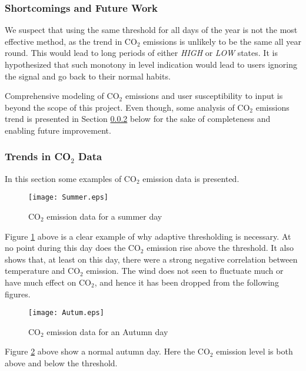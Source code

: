 \documentclass[Main]{subfiles}
\begin{document}
	\subsubsection{Shortcomings and Future Work} %
	\label{sub:shortcomings_and_future_work}
		We suspect that using the same threshold for all days of the year is not the most effective method, as the trend in CO$_2$ emissions is unlikely to be the same all year round.
		This would lead to long periods of either \emph{HIGH} or \emph{LOW} states.
		It is hypothesized that such monotony in level indication would lead to users ignoring the signal and go back to their normal habits.

		Comprehensive modeling of CO$_2$ emissions and user susceptibility to input is beyond the scope of this project.
		Even though, some analysis of CO$_2$ emissions trend is presented in Section \ref{sub:trends_in_co2_data} below for the sake of completeness and enabling future improvement.



	\subsubsection{Trends in CO$_2$ Data} %
	\label{sub:trends_in_co2_data}
		
		In this section some examples of CO$_2$ emission data is presented.

		\begin{figure}[H]
			\centering 
			\texttt{[image: Summer.eps]}
			\caption{CO$_2$ emission data for a summer day}
			\label{fig:Summer}
		\end{figure}

		Figure \ref{fig:Summer} above is a clear example of why adaptive thresholding is necessary.
		At no point during this day does the CO$_2$ emission rise above the threshold.
		It also shows that, at least on this day, there were a strong negative correlation between temperature and CO$_2$ emission.
		The wind does not seen to fluctuate much or have much effect on CO$_2$, and hence it has been dropped from the following figures.


		\begin{figure}[H]
			\centering
			\texttt{[image: Autum.eps]}
			\caption{CO$_2$ emission data for an Autumn day}
			\label{fig:Autum}
		\end{figure}

		Figure \ref{fig:Autum} above show a normal autumn day. Here the CO$_2$ emission level is both above and below the threshold.
\end{document}

